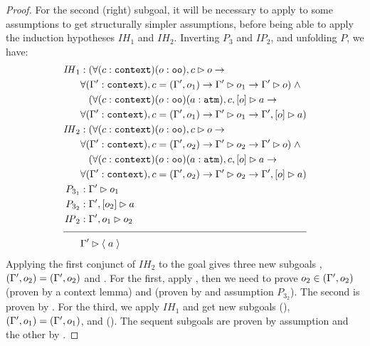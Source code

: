 \begin{proof}
For the second (right) subgoal, it will be necessary to apply  to some assumptions to get structurally simpler assumptions, 
before being able to apply the induction hypotheses $\mathit{IH}_1$ and
$\mathit{IH}_2$.
Inverting $P_3$ and $\mathit{IP}_2$, and unfolding $P$, we have:
\begin{align*}
\mathit{IH}_1 &: (\forall (c : \sltm{context}) (o : \sltm{oo}), \seqsl[c]{o} \rightarrow \\
& \forall (\inddyncon{} : \sltm{context}), c = (\inddyncon{}, o_1) \rightarrow \seqsl[\inddyncon{}]{o_1} \rightarrow \seqsl[\inddyncon{}]{o}) \; \wedge \\
& \;\;\; (\forall (c : \sltm{context}) (o : \sltm{oo}) (a : \sltm{atm}), \bchsl[c]{o}{a} \rightarrow \\
& \forall (\inddyncon{} : \sltm{context}), c = (\inddyncon{}, o_1) \rightarrow \seqsl[\inddyncon{}]{o_1} \rightarrow \bchsl[\inddyncon{}]{o}{a}) \\
\mathit{IH}_2 &: (\forall (c : \sltm{context}) (o : \sltm{oo}), \seqsl[c]{o} \rightarrow \\
& \forall (\inddyncon{} : \sltm{context}), c = (\inddyncon{}, o_2) \rightarrow \seqsl[\inddyncon{}]{o_2} \rightarrow \seqsl[\inddyncon{}]{o}) \; \wedge \\
& \;\;\; (\forall (c : \sltm{context}) (o : \sltm{oo}) (a : \sltm{atm}), \bchsl[c]{o}{a} \rightarrow \\
& \forall (\inddyncon{} : \sltm{context}), c = (\inddyncon{}, o_2) \rightarrow \seqsl[\inddyncon{}]{o_2} \rightarrow \bchsl[\inddyncon{}]{o}{a}) \\
P_{3_1} &: \seqsl[\inddyncon{}]{o_1} \\
P_{3_2} &: \bchsl[\inddyncon{}]{o_2}{a} \\
\mathit{IP}_2 &: \seqsl[\inddyncon{} , o_1]{o_2} \\[\pfshift{}]
\cline{1-2}
& \seqsl[\inddyncon{}]{\atom{a}}
\end{align*}
Applying the first conjunct of $\mathit{IH}_2$ to the goal gives three new subgoals , $(\Gamma'{} , o_2) = (\Gamma'{} , o_2)$ and . For the first, apply \rlnmsinit{}, then we need to prove $o_2 \in (\Gamma'{} , o_2)$ (proven by a context lemma) and  (proven by  and assumption $P_{3_2}$). The second is proven by . For the third, we apply $\mathit{IH}_1$ and get new subgoals (), $(\Gamma'{} , o_1) = (\Gamma'{} , o_1)$, and (). The sequent subgoals are proven by assumption and the other by .


\end{proof}
